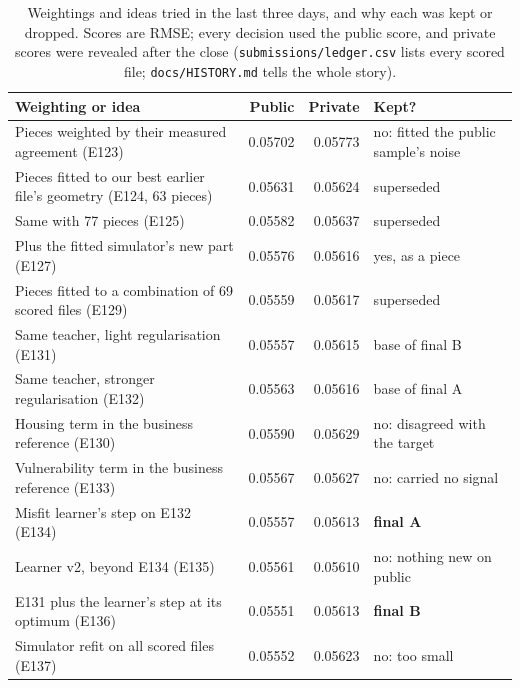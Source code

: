 \documentclass[10pt,twocolumn,a4paper]{article}
\newcommand{\code}[1]{\texttt{\small #1}}
\begin{document}
\begin{table}[t]
\centering\small
\caption{Weightings and ideas tried in the last three days, and why each was kept or dropped. Scores are RMSE; every
decision used the public score, and private scores were revealed after the close
(\code{submissions/ledger.csv} lists every scored file; \code{docs/HISTORY.md} tells the whole story).}
\label{tab:weights}
\begin{tabularx}{\columnwidth}{@{}Lrr>{\raggedright\arraybackslash}p{0.21\columnwidth}@{}}
\toprule
Weighting or idea & Public & Private & Kept?\\
\midrule
Pieces weighted by their measured agreement (E123) & 0.05702 & 0.05773 & no: fitted the public sample's noise\\
Pieces fitted to our best earlier file's geometry (E124, 63 pieces) & 0.05631 & 0.05624 & superseded\\
Same with 77 pieces (E125) & 0.05582 & 0.05637 & superseded\\
Plus the fitted simulator's new part (E127) & 0.05576 & 0.05616 & yes, as a piece\\
Pieces fitted to a combination of 69 scored files (E129) & 0.05559 & 0.05617 & superseded\\
Same teacher, light regularisation (E131) & 0.05557 & 0.05615 & base of final B\\
Same teacher, stronger regularisation (E132) & 0.05563 & 0.05616 & base of final A\\
Housing term in the business reference (E130) & 0.05590 & 0.05629 & no: disagreed with the target\\
Vulnerability term in the business reference (E133) & 0.05567 & 0.05627 & no: carried no signal\\
Misfit learner's step on E132 (E134) & 0.05557 & 0.05613 & \textbf{final A}\\
Learner v2, beyond E134 (E135) & 0.05561 & 0.05610 & no: nothing new on public\\
E131 plus the learner's step at its optimum (E136) & 0.05551 & 0.05613 & \textbf{final B}\\
Simulator refit on all scored files (E137) & 0.05552 & 0.05623 & no: too small\\
\bottomrule
\end{tabularx}
\end{table}
\end{document}
